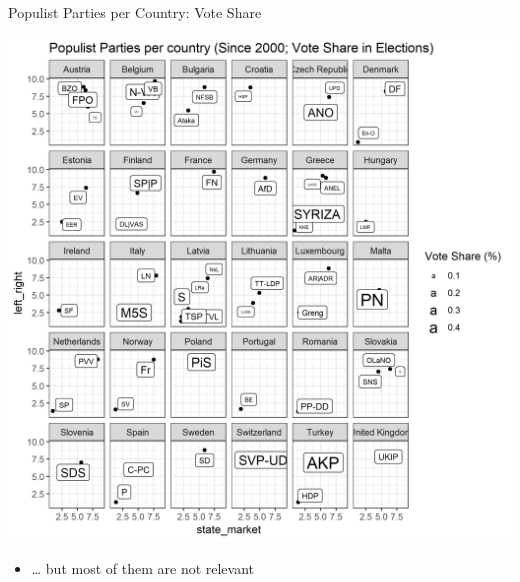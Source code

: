 \documentclass[
  ignorenonframetext,
]{beamer}
\providecommand{\tightlist}{%
  \setlength{\itemsep}{0pt}\setlength{\parskip}{0pt}}
\begin{document}
\begin{frame}{Populist Parties per Country: Vote Share}
\protect\hypertarget{populist-parties-per-country-vote-share}{}

\begin{center}\includegraphics[width=1\linewidth]{PNG/party_per_country_vote} \end{center}

\begin{itemize}
\tightlist
\item
  \ldots{} but most of them are not relevant
\end{itemize}

\end{frame}
\end{document}
